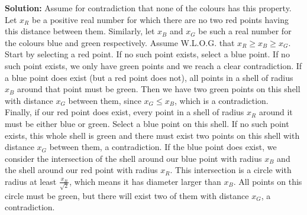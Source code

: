 \documentclass{article}
\begin{document}
\begin{enumerate}[itemsep=\fill]
\textbf{Solution:} Assume for contradiction that none of the colours has this property. Let $x_R$ be a positive real number for which there are no two red points having this distance between them. Similarly, let $x_B$ and $x_G$ be such a real number for the colours blue and green respectively. Assume W.L.O.G. that $x_R\geq x_B \geq x_G$. Start by selecting a red point. If no such point exists, select a blue point. If no such point exists, we only have green points and we reach a clear contradiction. If a blue point does exist (but a red point does not), all points in a shell of radius $x_B$ around that point must be green. Then we have two green points on this shell with distance $x_G$ between them, since $x_G\leq x_B$, which is a contradiction.\\
Finally, if our red point does exist, every point in a shell of radius $x_R$ around it must be either blue or green. Select a blue point on this shell. If no such point exists, this whole shell is green and there must exist two points on this shell with distance $x_G$ between them, a contradiction. If the blue point does exist, we consider the intersection of the shell around our blue point with radius $x_B$ and the shell around our red point with radius $x_R$. This intersection is a circle with radius at least $\frac{x_B}{\sqrt{2}}$, which means it has diameter larger than $x_B$. All points on this circle must be green, but there will exist two of them with distance $x_G$, a contradiction.

\end{enumerate}
\end{document}
